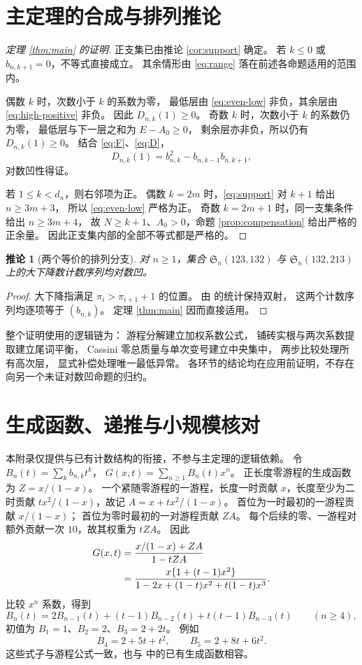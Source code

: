 \documentclass[UTF8,a4paper,11pt,fontset=none]{ctexart}
\numberwithin{equation}{section}
\theoremstyle{paperplain}
\newtheorem{corollary}[theorem]{推论}
\theoremstyle{definition}
\theoremstyle{remark}
\begin{document}
\section{主定理的合成与排列推论}\label{sec:finish}
\begin{proof}[定理 \ref{thm:main} 的证明]
正支集已由推论 \ref{cor:support} 确定。
若 $k\le0$ 或 $b_{n,k+1}=0$，不等式直接成立。
其余情形由 \eqref{eq:range} 落在前述各命题适用的范围内。

偶数 $k$ 时，次数小于 $k$ 的系数为零，
最低层由 \eqref{eq:even-low} 非负，其余层由 \eqref{eq:high-positive} 非负。
因此 $D_{n,k}(1)\ge0$。
奇数 $k$ 时，次数小于 $k$ 的系数仍为零，
最低层与下一层之和为 $E-A_0\ge0$，
剩余层亦非负，所以仍有 $D_{n,k}(1)\ge0$。
结合 \eqref{eq:F}、\eqref{eq:D}，
\[
D_{n,k}(1)=b_{n,k}^2-b_{n,k-1}b_{n,k+1},
\]
对数凹性得证。

若 $1\le k<d_n$，则右邻项为正。
偶数 $k=2m$ 时，\eqref{eq:support} 对 $k+1$ 给出 $n\ge3m+3$，
所以 \eqref{eq:even-low} 严格为正。
奇数 $k=2m+1$ 时，同一支集条件给出 $n\ge3m+4$，
故 $N\ge k+1$、$A_0>0$，命题 \ref{prop:compensation} 给出严格的正余量。
因此正支集内部的全部不等式都是严格的。
\end{proof}

\begin{corollary}[两个等价的排列分支]\label{cor:permutations}
对 $n\ge1$，集合 $\mathfrak S_n(123,132)$ 与 $\mathfrak S_n(132,213)$
上的大下降数计数序列均对数凹。
\end{corollary}
\begin{proof}
大下降指满足 $\pi_i>\pi_{i+1}+1$ 的位置。
由 \cite[Lemmas 3.6 and 3.9]{ERZ} 的统计保持双射，
这两个计数序列均逐项等于 $(b_{n,k})$。
定理 \ref{thm:main} 因而直接适用。
\end{proof}

整个证明使用的逻辑链为：
游程分解建立加权系数公式，
铺砖实根与两次系数提取建立尾词平衡，
Cassini 零总质量与单次变号建立中央集中，
两步比较处理所有高次层，
显式补偿处理唯一最低异常。
各环节的结论均在应用前证明，不存在向另一个未证对数凹命题的归约。

\appendix
\section{生成函数、递推与小规模核对}\label{sec:appendix}
本附录仅提供与已有计数结构的衔接，不参与主定理的逻辑依赖。
令 $B_n(t)=\sum_kb_{n,k}t^k$，
$G(x,t)=\sum_{n\ge1}B_n(t)x^n$。
正长度零游程的生成函数为 $Z=x/(1-x)$。
一个紧随零游程的一游程，长度一时贡献 $x$，长度至少为二时贡献
$tx^2/(1-x)$，故记
$A=x+tx^2/(1-x)$。
首位为一时最初的一游程贡献 $x/(1-x)$；
首位为零时最初的一对游程贡献 $ZA$。
每个后续的零、一游程对额外贡献一次 $10$，故其权重为 $tZA$。
因此
\begin{align}
G(x,t)
&=\frac{x/(1-x)+ZA}{1-tZA}\notag\\
&=\frac{x\{1+(t-1)x^2\}}
{1-2x+(1-t)x^2+t(1-t)x^3}.\label{eq:GF}
\end{align}
比较 $x^n$ 系数，得到
\[
B_n(t)=2B_{n-1}(t)+(t-1)B_{n-2}(t)
+t(t-1)B_{n-3}(t)\qquad(n\ge4),
\]
初值为 $B_1=1$、$B_2=2$、$B_3=2+2t$。
例如
\[
B_4=2+5t+t^2,\qquad B_5=2+8t+6t^2.
\]
这些式子与游程公式一致，也与 \cite{ERZ} 中的已有生成函数相容。
\end{document}
